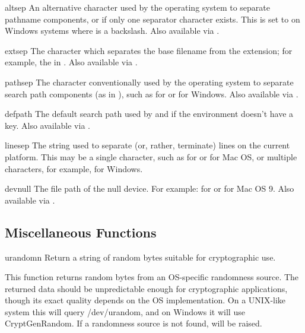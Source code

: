 \begin{datadesc}{altsep}
An alternative character used by the operating system to separate pathname
components, or  if only one separator character exists.  This is
set to \character{/} on Windows systems where  is a
backslash.
Also available via .
\end{datadesc}

\begin{datadesc}{extsep}
The character which separates the base filename from the extension;
for example, the  in .
Also available via .
\end{datadesc}

\begin{datadesc}{pathsep}
The character conventionally used by the operating system to separate
search path components (as in ), such as \character{:} for
\POSIX{} or \character{;} for Windows.
Also available via .
\end{datadesc}

\begin{datadesc}{defpath}
The default search path used by  and
 if the environment doesn't have a 
key.
Also available via .
\end{datadesc}

\begin{datadesc}{linesep}
The string used to separate (or, rather, terminate) lines on the
current platform.  This may be a single character, such as  for \POSIX{} or  for Mac OS, or multiple characters,
for example,  for Windows.
\end{datadesc}

\begin{datadesc}{devnull}
The file path of the null device.
For example:  for \POSIX{} or  for
Mac OS 9.
Also available via .
\end{datadesc}


\subsection{Miscellaneous Functions \label{os-miscfunc}}

\begin{funcdesc}{urandom}{n}
Return a string of  random bytes suitable for cryptographic use.

This function returns random bytes from an OS-specific
randomness source.  The returned data should be unpredictable enough for
cryptographic applications, though its exact quality depends on the OS
implementation.  On a UNIX-like system this will query /dev/urandom, and
on Windows it will use CryptGenRandom.  If a randomness source is not
found,  will be raised.
\end{funcdesc}





